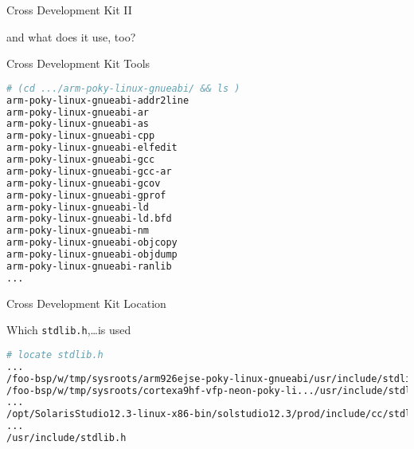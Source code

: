 \documentclass[ngerman,xcolor={table,dvipsnames},smaller,compress,hyperref={bookmarks,colorlinks}]{beamer}%
\begin{document}
\begin{frame}[fragile]{Cross Development Kit II}
\begin{block}{and what does it use, too?}
\begin{description}
\end{description}
\end{block}
\end{frame}

\begin{frame}[fragile]{Cross Development Kit Tools}
\begin{block}
\scriptsize
\begin{lstlisting}[language=sh,inputencoding=latin9]
# (cd .../arm-poky-linux-gnueabi/ && ls )
arm-poky-linux-gnueabi-addr2line
arm-poky-linux-gnueabi-ar
arm-poky-linux-gnueabi-as
arm-poky-linux-gnueabi-cpp
arm-poky-linux-gnueabi-elfedit
arm-poky-linux-gnueabi-gcc
arm-poky-linux-gnueabi-gcc-ar
arm-poky-linux-gnueabi-gcov
arm-poky-linux-gnueabi-gprof
arm-poky-linux-gnueabi-ld
arm-poky-linux-gnueabi-ld.bfd
arm-poky-linux-gnueabi-nm
arm-poky-linux-gnueabi-objcopy
arm-poky-linux-gnueabi-objdump
arm-poky-linux-gnueabi-ranlib
...
\end{lstlisting}
\end{block}
\end{frame}

\begin{frame}[fragile]{Cross Development Kit Location}
\begin{block}{Which \texttt{stdlib.h},\ldots is used}

\scriptsize
\begin{lstlisting}[language=sh,inputencoding=latin9]
# locate stdlib.h
...
/foo-bsp/w/tmp/sysroots/arm926ejse-poky-linux-gnueabi/usr/include/stdlib.h
/foo-bsp/w/tmp/sysroots/cortexa9hf-vfp-neon-poky-li.../usr/include/stdlib.h
...
/opt/SolarisStudio12.3-linux-x86-bin/solstudio12.3/prod/include/cc/stdlib.h
...
/usr/include/stdlib.h
\end{lstlisting}

\end{block}

\end{frame}
\end{document}
